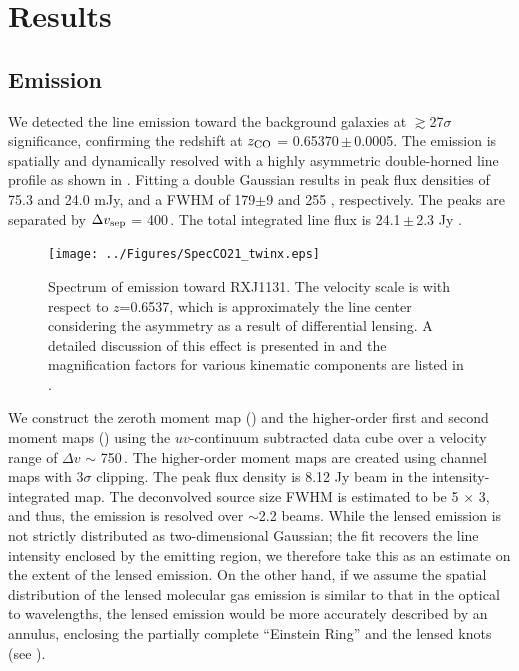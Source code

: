 \documentclass[]{emulateapj}
\begin{document}
\section{Results} \label{sec:results}
\subsection{\bco Emission} \label{sec:CO21} %
We detected the \bco line emission toward the background galaxies
at $\gtrsim$27$\sigma$ significance, confirming the redshift at $z_{\rm CO}$ =
0.65370\,$\pm$\,0.0005. The emission is spatially and dynamically resolved
with a highly asymmetric double-horned line profile
as shown in . Fitting a double Gaussian results in peak
flux densities of 75.3 and 24.0 mJy, and a FWHM of
179$\pm$9 \kms and 255 \kms, respectively. The peaks are separated by
$\Delta v_{\rm sep}$ = 400\,\kms. The total integrated line flux is 24.1\,$\pm$\,2.3 Jy \kms. %

\begin{figure}[!htbp]
\centering
\texttt{[image: ../Figures/SpecCO21\_twinx.eps]}
\caption{ Spectrum of \bco emission toward RXJ1131. The velocity scale
is with respect to $z$=0.6537, which is approximately the line center
considering the asymmetry as a result of differential lensing.
A detailed discussion of this effect is presented in
 and the magnification factors for various kinematic
components are listed in .
 \label{fig:CO21spec}}
\end{figure}

We construct the zeroth moment map () and
the higher-order first and second moment maps ()
using the $uv$-continuum subtracted data cube over a velocity range of
$\Delta v$ $\sim$ 750\,\kms. The higher-order moment maps are created using
channel maps with 3$\sigma$ clipping.
The peak flux density is 8.12 Jy\,\kms\,beam\pmOne
in the intensity-integrated map. The deconvolved source size FWHM
is estimated to be 5 $\times$ 3,
and thus, the emission is resolved over $\sim$2.2 beams.
While the lensed emission is not strictly distributed as two-dimensional
Gaussian;
the fit recovers the line intensity enclosed by the emitting
region, we therefore take this as an estimate on the extent of the lensed
emission. On the other hand, if we assume the spatial distribution of
the lensed molecular gas emission is similar to that in the optical to \nir
wavelengths, the lensed emission would be more accurately described by an
annulus, enclosing the partially complete ``Einstein Ring'' and
the lensed knots (see ).
\end{document}

